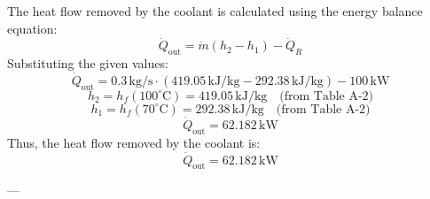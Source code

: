The heat flow removed by the coolant is calculated using the energy balance equation:  
\[
\dot{Q}_{\text{out}} = \dot{m} (h_2 - h_1) - \dot{Q}_R
\]  
Substituting the given values:  
\[
\dot{Q}_{\text{out}} = 0.3 \, \text{kg/s} \cdot (419.05 \, \text{kJ/kg} - 292.38 \, \text{kJ/kg}) - 100 \, \text{kW}
\]  
\[
h_2 = h_f(100^\circ\text{C}) = 419.05 \, \text{kJ/kg} \quad \text{(from Table A-2)}
\]  
\[
h_1 = h_f(70^\circ\text{C}) = 292.38 \, \text{kJ/kg} \quad \text{(from Table A-2)}
\]  
\[
\dot{Q}_{\text{out}} = 62.182 \, \text{kW}
\]  
Thus, the heat flow removed by the coolant is:  
\[
\dot{Q}_{\text{out}} = 62.182 \, \text{kW}
\]  

---